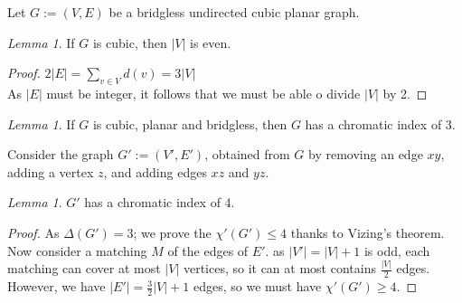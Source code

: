 \documentclass[12pt]{article}
\theoremstyle{definition}
\theoremstyle{remark}
\newtheorem{lemma}[theorem]{Lemma}
\begin{document}
    

Let $G:= (V, E)$ be a bridgless undirected cubic planar graph.
\begin{lemma}
    If $G$ is cubic, then $|V|$ is even.
\end{lemma}

\begin{proof}
    $2|E| = \sum_{v \in V} d(v) = 3|V| $ \\
    As $|E|$ must be integer, it follows that we must be able o divide $|V|$ by 2.
\end{proof}

\begin{lemma}
    If $G$ is cubic, planar and bridgless, then $G$ has a chromatic index of 3. 
\end{lemma}


Consider the graph $G':= (V', E')$, obtained from $G$ by removing an edge $xy$, adding a vertex $z$, and adding edges $xz$ and $yz$. 
\begin{lemma}
    $G'$ has a chromatic index of 4.
\end{lemma}

\begin{proof}
    As $\Delta(G') = 3$; we prove the $\chi'(G') \le 4$ thanks to Vizing's theorem.\\
    Now consider a matching $M$ of the edges of $E'$. as $|V'| = |V|+1$ is odd, each matching can cover at most $|V|$ vertices,
    so it can at most contains $\tfrac{|V|}{2}$ edges. However, we have $|E'| = \tfrac{3}{2} |V| + 1$ edges, so we must have $\chi'(G') \ge 4$.
\end{proof}
\end{document}
